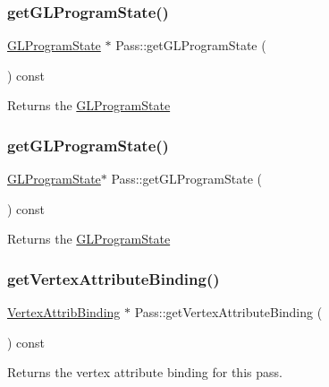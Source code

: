 \subsubsection{\texorpdfstring{get\+G\+L\+Program\+State()}{getGLProgramState()}\hspace{0.1cm}{\footnotesize\ttfamily [1/2]}}
{\footnotesize\ttfamily \hyperlink{classGLProgramState}{G\+L\+Program\+State} $\ast$ Pass\+::get\+G\+L\+Program\+State (\begin{DoxyParamCaption}{ }\end{DoxyParamCaption}) const}

Returns the \hyperlink{classGLProgramState}{G\+L\+Program\+State} \mbox{\label{classPass_ab1fd602c33cc2ac73585f578e8a22412}} 
\subsubsection{\texorpdfstring{get\+G\+L\+Program\+State()}{getGLProgramState()}\hspace{0.1cm}{\footnotesize\ttfamily [2/2]}}
{\footnotesize\ttfamily \hyperlink{classGLProgramState}{G\+L\+Program\+State}$\ast$ Pass\+::get\+G\+L\+Program\+State (\begin{DoxyParamCaption}{ }\end{DoxyParamCaption}) const}

Returns the \hyperlink{classGLProgramState}{G\+L\+Program\+State} \mbox{\label{classPass_a60893bb19b8e68ad0b5d8139aaf10202}} 
\subsubsection{\texorpdfstring{get\+Vertex\+Attribute\+Binding()}{getVertexAttributeBinding()}\hspace{0.1cm}{\footnotesize\ttfamily [1/2]}}
{\footnotesize\ttfamily \hyperlink{classVertexAttribBinding}{Vertex\+Attrib\+Binding} $\ast$ Pass\+::get\+Vertex\+Attribute\+Binding (\begin{DoxyParamCaption}{ }\end{DoxyParamCaption}) const}

Returns the vertex attribute binding for this pass.

